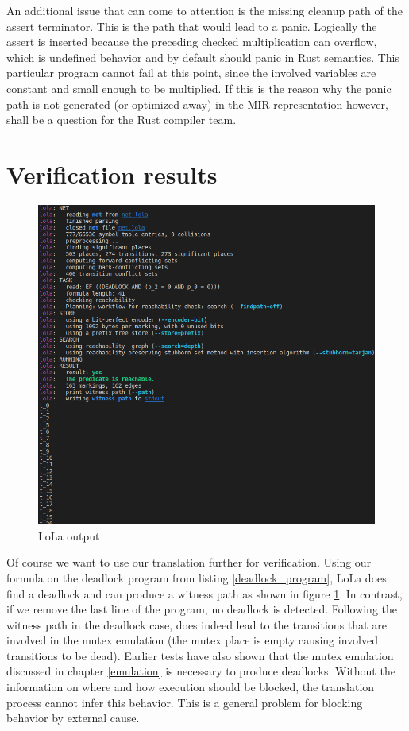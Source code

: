 An additional issue that can come to attention is the missing cleanup path of the assert terminator.
This is the path that would lead to a panic.
Logically the assert is inserted because the preceding checked multiplication can overflow, which is undefined behavior and by default should panic in Rust semantics.
This particular program cannot fail at this point, since the involved variables are constant and small enough to be multiplied.
If this is the reason why the panic path is not generated (or optimized away) in the MIR representation however, shall be a question for the Rust compiler team.

\section{Verification results}
\begin{figure}
  \centering
  \includegraphics[width=1\textwidth]{./pictures/lola_output.png}
  \caption{LoLa output}
  \label{lola_output}
\end{figure}
Of course we want to use our translation further for verification.
Using our formula on the deadlock program from listing \ref{deadlock_program}, LoLa does find a deadlock and can produce a witness path as shown in figure \ref{lola_output}.
In contrast, if we remove the last line of the program, no deadlock is detected.
Following the witness path in the deadlock case, does indeed lead to the transitions that are involved in the mutex emulation (the mutex place is empty causing involved transitions to be dead).
Earlier tests have also shown that the mutex emulation discussed in chapter \ref{emulation} is necessary to produce deadlocks.
Without the information on where and how execution should be blocked, the translation process cannot infer this behavior.
This is a general problem for blocking behavior by external cause.

